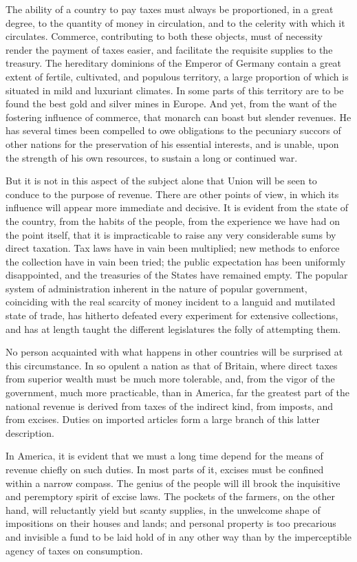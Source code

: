 The ability of a country to pay taxes must always be proportioned, in a great degree, to the quantity of money in circulation, and to the celerity with which it circulates. Commerce, contributing to both these objects, must of necessity render the payment of taxes easier, and facilitate the requisite supplies to the treasury. The hereditary dominions of the Emperor of Germany contain a great extent of fertile, cultivated, and populous territory, a large proportion of which is situated in mild and luxuriant climates. In some parts of this territory are to be found the best gold and silver mines in Europe. And yet, from the want of the fostering influence of commerce, that monarch can boast but slender revenues. He has several times been compelled to owe obligations to the pecuniary succors of other nations for the preservation of his essential interests, and is unable, upon the strength of his own resources, to sustain a long or continued war.

But it is not in this aspect of the subject alone that Union will be seen to conduce to the purpose of revenue. There are other points of view, in which its influence will appear more immediate and decisive. It is evident from the state of the country, from the habits of the people, from the experience we have had on the point itself, that it is impracticable to raise any very considerable sums by direct taxation. Tax laws have in vain been multiplied; new methods to enforce the collection have in vain been tried; the public expectation has been uniformly disappointed, and the treasuries of the States have remained empty. The popular system of administration inherent in the nature of popular government, coinciding with the real scarcity of money incident to a languid and mutilated state of trade, has hitherto defeated every experiment for extensive collections, and has at length taught the different legislatures the folly of attempting them.

No person acquainted with what happens in other countries will be surprised at this circumstance. In so opulent a nation as that of Britain, where direct taxes from superior wealth must be much more tolerable, and, from the vigor of the government, much more practicable, than in America, far the greatest part of the national revenue is derived from taxes of the indirect kind, from imposts, and from excises. Duties on imported articles form a large branch of this latter description.

In America, it is evident that we must a long time depend for the means of revenue chiefly on such duties. In most parts of it, excises must be confined within a narrow compass. The genius of the people will ill brook the inquisitive and peremptory spirit of excise laws. The pockets of the farmers, on the other hand, will reluctantly yield but scanty supplies, in the unwelcome shape of impositions on their houses and lands; and personal property is too precarious and invisible a fund to be laid hold of in any other way than by the imperceptible agency of taxes on consumption.

